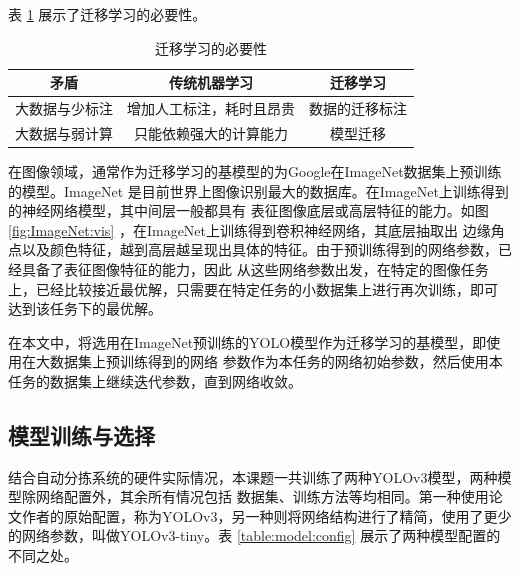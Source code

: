 表 \ref{table:TL:biyao} 展示了迁移学习的必要性。
{
    \begin{table}[htb] 
        \caption{迁移学习的必要性}
        \label{table:TL:biyao}
        \centering
        \begin{tabular}[t]{c|c|c}
            \hline
            矛盾 & 传统机器学习 & 迁移学习 \\
            \hline
            大数据与少标注 & 增加人工标注，耗时且昂贵 & 数据的迁移标注\\
            \hline
            大数据与弱计算 & 只能依赖强大的计算能力 & 模型迁移\\
            \hline
        \end{tabular}
    \end{table}
}

在图像领域，通常作为迁移学习的基模型的为Google在ImageNet数据集上预训练的模型。ImageNet
是目前世界上图像识别最大的数据库。在ImageNet上训练得到的神经网络模型，其中间层一般都具有
表征图像底层或高层特征的能力。如图 \cite{ImageNet_vis} \ref{fig:ImageNet:vis} ，在ImageNet上训练得到卷积神经网络，其底层抽取出
边缘角点以及颜色特征，越到高层越呈现出具体的特征。由于预训练得到的网络参数，已经具备了表征图像特征的能力，因此
从这些网络参数出发，在特定的图像任务上，已经比较接近最优解，只需要在特定任务的小数据集上进行再次训练，即可
达到该任务下的最优解。



在本文中，将选用在ImageNet预训练的YOLO模型作为迁移学习的基模型，即使用在大数据集上预训练得到的网络
参数作为本任务的网络初始参数，然后使用本任务的数据集上继续迭代参数，直到网络收敛。






\subsection{模型训练与选择}
结合自动分拣系统的硬件实际情况，本课题一共训练了两种YOLOv3模型，两种模型除网络配置外，其余所有情况包括
数据集、训练方法等均相同。第一种使用论文作者的原始配置，称为YOLOv3，另一种则将网络结构进行了精简，使用了更少
的网络参数，叫做YOLOv3-tiny。表 \ref{table:model:config} 展示了两种模型配置的不同之处。

